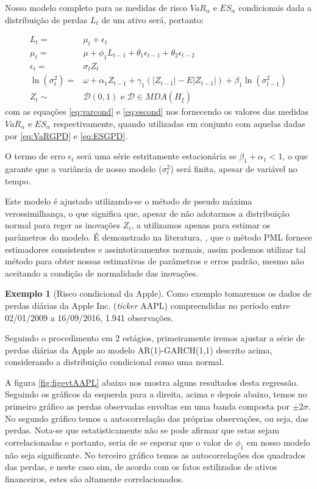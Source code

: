 \documentclass[review]{elsarticle}
\theoremstyle{definition}
\newtheorem{exemplo}[teor]{Exemplo}
\begin{document}
Nosso modelo completo para as medidas de risco $VaR_\alpha$ e $ES_\alpha$ condicionais dada a distribuição de perdas $L_t$ de um ativo será, portanto:

\begin{align}
L_t=&\mu_t+\epsilon_t \\
\mu_t=&\mu+ \phi_1 L_{t-1}+ \theta_1\epsilon_{t-1}+ \theta_2\epsilon_{t-2} \label{eq:mut} \\
\epsilon_t=&\sigma_t Z_t\\
\ln(\sigma_t^2)=&\omega+ \alpha_1 Z_{t-1}+ \gamma_1(|Z_{t-1}|-E|Z_{t-1}|)+ \beta_1 \ln(\sigma_{t-1}^2) \label{eq:sigma2} \\
Z_t\sim &\mathcal{D}(0,1) \text{ e } \mathcal{D} \in MDA(H_\xi)
\end{align}
com as equações \eqref{eq:varcond} e \eqref{eq:escond} nos fornecendo os valores das medidas $VaR_\alpha$ e $ES_\alpha$ respectivamente, quando utilizadas em conjunto com aquelas dadas por \eqref{eq:VaRGPD} e \eqref{eq:ESGPD}.

O termo de erro $\epsilon_t$ será uma série estritamente estacionária se $\beta_1+\alpha_1<1$, o que garante que a variância de nosso modelo ($\sigma_t^2$) será finita, apesar de variável no tempo.

Este modelo é ajustado utilizando-se o método de pseudo máxima verossimilhança, o que significa que, apesar de não adotarmos a distribuição normal para reger as inovações $Z_t$, a utilizamos apenas para estimar os parâmetros do modelo. É demonstrado na literatura, \cite[Capítulo 4]{Gourieroux1997}, que o método PML fornece estimadores consistentes e assintoticamentes normais, assim podemos utilizar tal método para obter nossas estimativas de parâmetros e erros padrão, mesmo não aceitando a condição de normalidade das inovações.

\begin{exemplo}[Risco condicional da Apple]
	\label{exe:appl}
	Como exemplo tomaremos os dados de perdas diárias da Apple Inc. (\emph{ticker} AAPL) compreendidas no período entre 02/01/2009 a 16/09/2016, 1.941 observações. 
\end{exemplo}

Seguindo o procedimento em 2 estágios, primeiramente iremos ajustar a série de perdas diárias da Apple ao modelo AR(1)-GARCH(1,1) descrito acima, considerando a distribuição condicional como uma normal. 

A figura \ref{fig:figevtAAPL} abaixo nos mostra alguns resultados desta regressão. Seguindo os gráficos da esquerda para a direita, acima e depois abaixo, temos no primeiro gráfico as perdas observadas envoltas em uma banda composta por $\pm 2\sigma$. No segundo gráfico temos a autocorrelação das próprias observações, ou seja, das perdas. Nota-se que estatisticamente não se pode afirmar que estas sejam correlacionadas e portanto, seria de se esperar que o valor de $\phi_1$ em nosso modelo não seja significante. No terceiro gráfico temos as autocorrelações dos quadrados das perdas, e neste caso sim, de acordo com os fatos estilizados de ativos financeiros, estes são altamente correlacionados.
\end{document}

